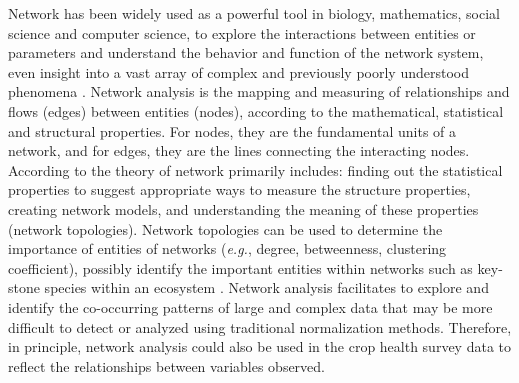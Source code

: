 Network has been widely used as a powerful tool in biology, mathematics, social science and computer science, to explore the interactions between entities or parameters \citep{Kasari_2011_Social, Proulx_2005_Network,  Barberan_2012_Network} and understand the behavior and function of the network system, even insight into a vast array of complex and previously poorly understood phenomena \citep{Newman_2003_Structure}. Network analysis is the mapping and measuring of relationships and flows (edges) between entities (nodes), according to the mathematical, statistical and structural properties. For nodes, they are the fundamental units of a network, and for edges, they are the lines connecting the interacting nodes.  According to \citet{Newman_2003_Structure} the theory of network primarily includes: finding out the statistical properties to suggest appropriate ways to measure the structure properties, creating network models, and understanding the meaning of these properties (network topologies). Network topologies can be used to determine the importance of entities of networks (\textit{e.g.}, degree, betweenness, clustering coefficient), possibly identify the important entities within networks such as key- stone species within an ecosystem \citep{Lu_2013_Soil, Borthagaray_2014_Inferring}. Network analysis facilitates to explore and identify the co-occurring patterns of large and complex data that may be more difficult to detect or analyzed using traditional normalization methods. Therefore, in principle, network analysis could also be used in the crop health survey data to reflect the relationships between variables observed. 


